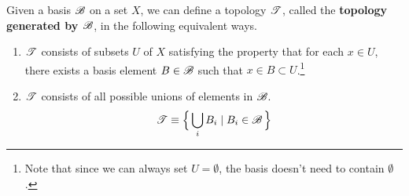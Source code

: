   \begin{definition}
    \label{def:basis-to-topology}
    Given a basis $\operatorname{\mathscr{B}}$ on a set $X$, we can define a topology $\operatorname{\mathscr{T}}$, called the \textbf{topology generated by $\operatorname{\mathscr{B}}$}, in the following equivalent ways. 
    \begin{enumerate}
      \item $\operatorname{\mathscr{T}}$ consists of subsets $U$ of $X$ satisfying the property that for each $x \in U$, there exists a basis element $B \in \operatorname{\mathscr{B}}$ such that $x \in B \subset U$.\footnote{Note that since we can always set $U = \emptyset$, the basis doesn't need to contain $\emptyset$. }
      \begin{center}
      \end{center}

      \item $\operatorname{\mathscr{T}}$ consists of all possible unions of elements in $\operatorname{\mathscr{B}}$. 
      \begin{equation}
        \operatorname{\mathscr{T}} \equiv \Big\{ \bigcup_i B_i \mid B_i \in \operatorname{\mathscr{B}}\Big\}
      \end{equation}
    \end{enumerate}
  \end{definition} 
